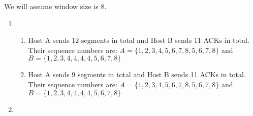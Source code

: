 \documentclass{report}
\begin{document}
\begin{problem}
\begin{answer}{30em}
    We will assume window size is 8.
    \begin{enumerate}
        \item 
            \begin{enumerate}[label=\textit{(\roman*)}]
                \item Host A sends 12 segments in total and Host B sends 11 ACKs in total. Their 
                    sequence numbers are: $A = \{1, 2, 3, 4, 5, 6, 7, 8, 5, 6, 7, 8\}$ and
                    $B = \{1, 2, 3, 4, 4, 4, 4, 5, 6, 7, 8\}$
                \item Host A sends 9 segments in total and Host B sends 11 ACKs in total. Their 
                    sequence numbers are: $A = \{1, 2, 3, 4, 5, 6, 7, 8, 5, 6, 7, 8\}$ and
                    $B = \{1, 2, 3, 4, 4, 4, 4, 5, 6, 7, 8\}$
            \end{enumerate}
        \item 
    \end{enumerate}
\end{answer}
\end{problem}
\end{document}
